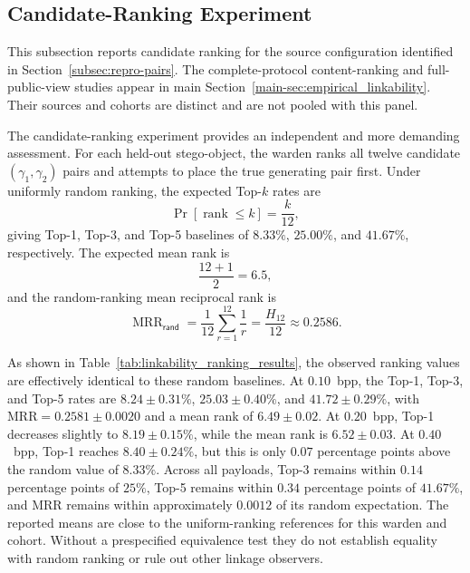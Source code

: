 \documentclass[journal]{IEEEtran}
\theoremstyle{definition}
\theoremstyle{game}
\begin{document}
\subsection{Candidate-Ranking Experiment}\label{candidate_ranking}
This subsection reports candidate ranking for the source configuration
identified in Section~\ref{subsec:repro-pairs}. The complete-protocol
content-ranking and full-public-view studies appear in main
Section~\ref{main-sec:empirical_linkability}. Their sources and cohorts
are distinct and are not pooled with this panel.

The candidate-ranking experiment provides an independent and more demanding assessment. For each held-out stego-object, the warden ranks all twelve candidate $(\gamma_1,\gamma_2)$ pairs and attempts to place the true generating pair first. Under uniformly random ranking, the expected Top-$k$ rates are
\[
   \Pr[\operatorname{rank}\leq k]=\frac{k}{12},
\]
giving Top-1, Top-3, and Top-5 baselines of $8.33\%$, $25.00\%$, and
$41.67\%$, respectively. The expected mean rank is
\[
   \frac{12+1}{2}=6.5,
\]
and the random-ranking mean reciprocal rank is
\[
   \operatorname{MRR}_{\mathsf{rand}}
   =
   \frac{1}{12}\sum_{r=1}^{12}\frac{1}{r}
   =
   \frac{H_{12}}{12}
   \approx 0.2586.
\]

As shown in Table~\ref{tab:linkability_ranking_results}, the observed
ranking values are effectively identical to these random baselines.
At $0.10$~bpp, the Top-1, Top-3, and Top-5 rates are
$8.24\pm0.31\%$, $25.03\pm0.40\%$, and
$41.72\pm0.29\%$, with $\mathrm{MRR}=0.2581\pm0.0020$ and a
mean rank of $6.49\pm0.02$. At $0.20$~bpp, Top-1 decreases slightly to
$8.19\pm0.15\%$, while the mean rank is
$6.52\pm0.03$. At $0.40$~bpp, Top-1 reaches
$8.40\pm0.24\%$, but this is only $0.07$ percentage points above the
random value of $8.33\%$. Across all payloads, Top-3 remains within
$0.14$ percentage points of $25\%$, Top-5 remains within
$0.34$ percentage points of $41.67\%$, and MRR remains within
approximately $0.0012$ of its random expectation. The reported means are close to the uniform-ranking references for this
warden and cohort. Without a prespecified equivalence test they do not
establish equality with random ranking or rule out other linkage observers.

\end{document}
